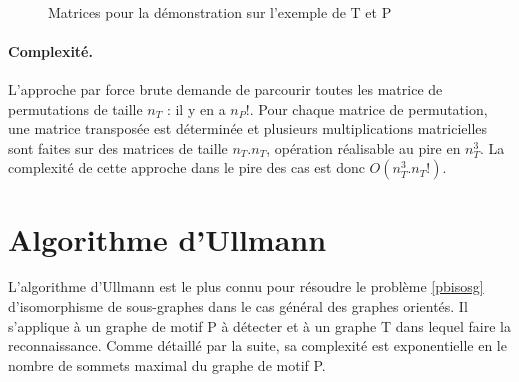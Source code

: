 \begin{figure}[ht]
\begin{center}
  \quad
  \quad
{}\\
\end{center}
\caption{Matrices pour la démonstration sur l'exemple de T et P}
\label{fig:mat-exemplesub}
\end{figure}




\paragraph{Complexité.}
L'approche par force brute demande de parcourir toutes les matrice de permutations de taille $n_T$ : il y en a $n_P!$. Pour chaque matrice de permutation, une matrice transposée est déterminée et plusieurs multiplications matricielles sont faites sur des matrices de taille $n_T.n_T$, opération réalisable au pire en $n_T^3$. La complexité de cette approche dans le pire des cas est donc $O(n_T^3.n_T!)$.


\section{Algorithme d'Ullmann}
L'algorithme d'Ullmann est le plus connu pour résoudre le problème \ref{pbisosg} d'isomorphisme de sous-graphes \cite{Ull76} dans le cas général des graphes orientés. Il s'applique à un graphe de motif P à détecter et à un graphe T dans lequel faire la reconnaissance. Comme détaillé par la suite, sa complexité est exponentielle en le nombre de sommets maximal du graphe de motif P.

